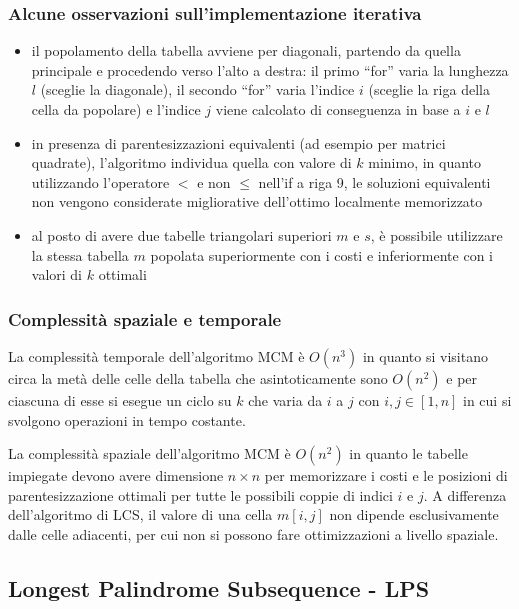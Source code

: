 \subsubsection*{Alcune osservazioni sull'implementazione iterativa}
\begin{itemize}
	\item il popolamento della tabella avviene per diagonali, partendo da quella principale e procedendo verso l'alto a destra:
	il primo ``for'' varia la lunghezza \(l\) (sceglie la diagonale), il secondo ``for'' varia l'indice \(i\) (sceglie la riga
	della cella da popolare) e l'indice \(j\) viene calcolato di conseguenza in base a \(i\) e \(l\)
	\item in presenza di parentesizzazioni equivalenti (ad esempio per matrici quadrate), l'algoritmo individua quella con
	valore di \(k\) minimo, in quanto utilizzando l'operatore \(<\) e non \(\leq\) nell'if a riga 9, le soluzioni equivalenti
	non vengono considerate migliorative dell'ottimo localmente memorizzato
	\item al posto di avere due tabelle triangolari superiori \(m\) e \(s\), è possibile utilizzare la stessa tabella \(m\)
	popolata superiormente con i costi e inferiormente con i valori di \(k\) ottimali
\end{itemize}

\subsubsection*{Complessità spaziale e temporale}
La complessità temporale dell'algoritmo MCM è \(O(n^3)\) in quanto si visitano circa la metà delle celle della tabella che
asintoticamente sono \(O(n^2)\) e per ciascuna di esse si esegue un ciclo su \(k\) che varia da \(i\) a \(j\) con
\(i, j \in [1, n]\) in cui si svolgono operazioni in tempo costante.

La complessità spaziale dell'algoritmo MCM è \(O(n^2)\) in quanto le tabelle impiegate devono avere dimensione \(n \times n\)
per memorizzare i costi e le posizioni di parentesizzazione ottimali per tutte le possibili coppie di indici \(i\) e \(j\).
A differenza dell'algoritmo di LCS, il valore di una cella \(m[i, j]\) non dipende esclusivamente dalle celle adiacenti, per
cui non si possono fare ottimizzazioni a livello spaziale.

\newpage

\subsection{Longest Palindrome Subsequence - LPS}
